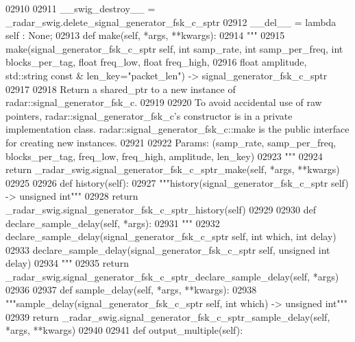 \begin{DoxyCode}
{{{{{{{{{{{02910 
02911     \_\_swig\_destroy\_\_ = \_radar\_swig.delete\_signal\_generator\_fsk\_c\_sptr
02912     \_\_del\_\_ = \textcolor{keyword}{lambda} self : \textcolor{keywordtype}{None};
02913     \textcolor{keyword}{def }make(self, *args, **kwargs):
02914         \textcolor{stringliteral}{"""}
02915 \textcolor{stringliteral}{        make(signal\_generator\_fsk\_c\_sptr self, int samp\_rate, int samp\_per\_freq, int blocks\_per\_tag, float
       freq\_low, float freq\_high, }
02916 \textcolor{stringliteral}{            float amplitude, std::string const & len\_key="packet\_len") -> signal\_generator\_fsk\_c\_sptr}
02917 \textcolor{stringliteral}{}
02918 \textcolor{stringliteral}{        Return a shared\_ptr to a new instance of radar::signal\_generator\_fsk\_c.}
02919 \textcolor{stringliteral}{}
02920 \textcolor{stringliteral}{        To avoid accidental use of raw pointers, radar::signal\_generator\_fsk\_c's constructor is in a
       private implementation class. radar::signal\_generator\_fsk\_c::make is the public interface for creating new
       instances.}
02921 \textcolor{stringliteral}{}
02922 \textcolor{stringliteral}{        Params: (samp\_rate, samp\_per\_freq, blocks\_per\_tag, freq\_low, freq\_high, amplitude, len\_key)}
02923 \textcolor{stringliteral}{        """}
02924         \textcolor{keywordflow}{return} \_radar\_swig.signal\_generator\_fsk\_c\_sptr\_make(self, *args, **kwargs)
02925 
02926     \textcolor{keyword}{def }history(self):
02927         \textcolor{stringliteral}{"""history(signal\_generator\_fsk\_c\_sptr self) -> unsigned int"""}
02928         \textcolor{keywordflow}{return} \_radar\_swig.signal\_generator\_fsk\_c\_sptr\_history(self)
02929 
02930     \textcolor{keyword}{def }declare_sample_delay(self, *args):
02931         \textcolor{stringliteral}{"""}
02932 \textcolor{stringliteral}{        declare\_sample\_delay(signal\_generator\_fsk\_c\_sptr self, int which, int delay)}
02933 \textcolor{stringliteral}{        declare\_sample\_delay(signal\_generator\_fsk\_c\_sptr self, unsigned int delay)}
02934 \textcolor{stringliteral}{        """}
02935         \textcolor{keywordflow}{return} \_radar\_swig.signal\_generator\_fsk\_c\_sptr\_declare\_sample\_delay(self, *args)
02936 
02937     \textcolor{keyword}{def }sample_delay(self, *args, **kwargs):
02938         \textcolor{stringliteral}{"""sample\_delay(signal\_generator\_fsk\_c\_sptr self, int which) -> unsigned int"""}
02939         \textcolor{keywordflow}{return} \_radar\_swig.signal\_generator\_fsk\_c\_sptr\_sample\_delay(self, *args, **kwargs)
02940 
02941     \textcolor{keyword}{def }output_multiple(self):
}}}}}}}}}}}
\end{DoxyCode}
